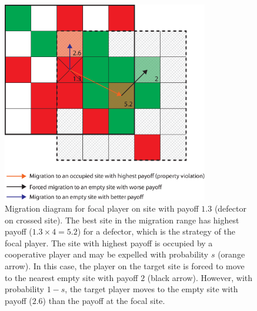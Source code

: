\begin{figure}[h!]
\begin{center}
\centerline{\includegraphics[width=9cm]{../figures2/migration_diagram.eps}}
\caption{Migration diagram for focal player on site with payoff $1.3$ (defector on crossed site). The best site in the migration range has highest payoff ($1.3 \times 4 = 5.2$) for a defector, which is the strategy of the focal player. The site with highest payoff is occupied by a cooperative player and may be expelled with probability $s$ (orange arrow). In this case, the player on the target site is forced to move to the nearest empty site with payoff $2$ (black arrow). However, with probability $1-s$, the target player moves to the empty site with payoff ($2.6$) than the payoff at the focal site.}
\label{fig:migration_diagram}
\end{center}
\end{figure}


